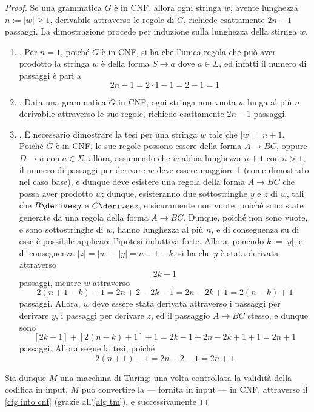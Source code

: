 \documentclass[a4paper, 12pt]{report}
\begin{document}
    \begin{proof}
        Se una grammatica $G$ è in CNF, allora ogni stringa $w$, avente lunghezza $n := |w| \ge 1$, derivabile attraverso le regole di $G$, richiede esattamente $2n - 1$ passaggi. La dimostrazione procede per induzione sulla lunghezza della stirnga $w$.

        \begin{enumerate}[label=]
            \item {}. Per $n = 1$, poiché $G$ è in CNF, si ha che l'unica regola che può aver prodotto la stringa $w$ è della forma $S \to a$ dove $a \in \Sigma$, ed infatti il numero di passaggi è pari a $$2n - 1 = 2 \cdot 1 -1 = 2 - 1 = 1$$
            \item {}. Data una grammatica $G$ in CNF, ogni stringa non vuota $w$ lunga al più $n$ derivabile attraverso le sue regole, richiede esattamente $2n-1$ passaggi.
            \item {}. È necessario dimostrare la tesi per una stringa $w$ tale che $|w| = n + 1$. Poiché $G$ è in CNF, le sue regole possono essere della forma $A \to BC$, oppure $D \to a$ con $a \in \Sigma$; allora, assumendo che $w$ abbia lunghezza $n + 1$ con $n > 1$, il numero di passaggi per derivare $w$ deve essere maggiore 1 (come dimostrato nel caso base), e dunque deve esistere una regola della forma $A \to BC$ che possa aver prodotto $w$; dunque, esisteranno due sottostringhe $y$ e $z$ di $w$, tali che $B \derives y$ e $C \derives z$, e sicuramente non vuote, poiché sono state generate da una regola della forma $A \to BC$. Dunque, poiché non sono vuote, e sono sottostringhe di $w$, hanno lunghezza al più $n$, e di conseguenza su di esse è possibile applicare l'ipotesi induttiva forte. Allora, ponendo $k := |y|$, e di conseguenza $|z| = |w| - |y| = n + 1 - k$, si ha che $y$ è stata derivata attraverso $$2k - 1$$ passaggi, mentre $w$ attraverso $$2(n+ 1 - k) - 1 = 2n+2-2k -1 = 2n-2k+1 = 2(n -k) + 1$$ passaggi. Allora, $w$ deve essere stata derivata attraverso i passaggi per derivare $y$, i passaggi per derivare $z$, ed il passaggio $A \to BC$ stesso, e dunque sono $$[2k - 1] + [2(n - k) + 1 ] + 1= 2k -1 +2n -2k +1 + 1 = 2n + 1$$ passaggi. Allora segue la tesi, poiché $$2(n + 1) - 1= 2n + 2 - 1 = 2n +1$$
        \end{enumerate}

        Sia dunque $M$ una macchina di Turing; una volta controllata la validità della codifica in input, $M$ può convertire la \CFG --- fornita in input --- in CNF, attraverso il \cref{cfg into cnf} (grazie all'\cref{alg tm}), e successivamente


\end{proof}
\end{document}
